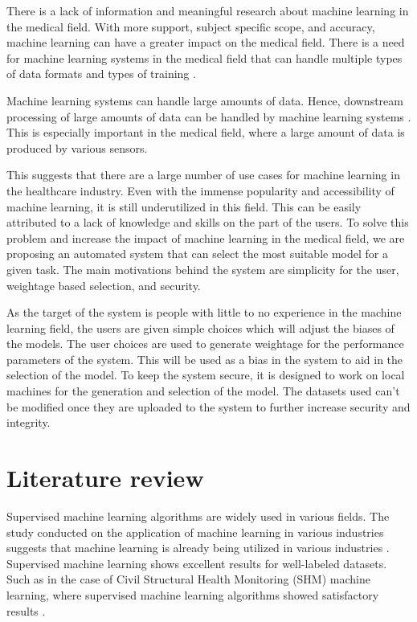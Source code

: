 \documentclass[a4paper,fleqn]{cas-dc}
\begin{document}
There is a lack of information and meaningful research about machine learning in the medical field. With more support, subject specific scope, and accuracy, machine learning can have a greater impact on the medical field. There is a need for machine learning systems in the medical field that can handle multiple types of data formats and types of training \cite{ref_paper_24}.

Machine learning systems can handle large amounts of data. Hence, downstream processing of large amounts of data can be handled by machine learning systems \cite{ref_paper_12}. This is especially important in the medical field, where a large amount of data is produced by various sensors.

This suggests that there are a large number of use cases for machine learning in the healthcare industry. Even with the immense popularity and accessibility of machine learning, it is still underutilized in this field. This can be easily attributed to a lack of knowledge and skills on the part of the users. To solve this problem and increase the impact of machine learning in the medical field, we are proposing an automated system that can select the most suitable model for a given task. The main motivations behind the system are simplicity for the user, weightage based selection, and security.

As the target of the system is people with little to no experience in the machine learning field, the users are given simple choices which will adjust the biases of the models. The user choices are used to generate weightage for the performance parameters of the system. This will be used as a bias in the system to aid in the selection of the model. To keep the system secure, it is designed to work on local machines for the generation and selection of the model. The datasets used can't be modified once they are uploaded to the system to further increase security and integrity.

\section{Literature review}\label{sec:literature_review}

Supervised machine learning algorithms are widely used in various fields. The study conducted on the application of machine learning in various industries suggests that machine learning is already being utilized in various industries \cite{ref_paper_14}. Supervised machine learning shows excellent results for well-labeled datasets. Such as in the case of Civil Structural Health Monitoring (SHM) machine learning, where supervised machine learning algorithms showed satisfactory results \cite{ref_paper_6}.
\end{document}
